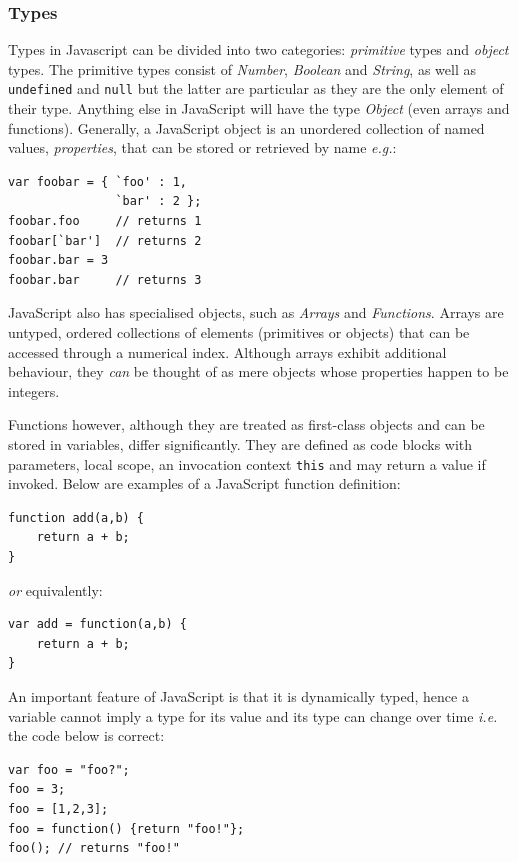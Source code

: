 \subsubsection{Types}
Types in Javascript can be divided into two categories: \emph{primitive} types and \emph{object} types. The primitive types consist of \emph{Number}, \emph{Boolean} and \emph{String}, as well as \texttt{undefined} and \texttt{null} but the latter are particular as they are the only element of their type. Anything else in JavaScript will have the type \emph{Object} (even arrays and functions). Generally, a JavaScript object is an unordered collection of named values, \emph{properties}, that can be stored or retrieved by name \emph{e.g.}:

\begin{lstlisting}
var foobar = { `foo' : 1,
               `bar' : 2 };
foobar.foo     // returns 1
foobar[`bar']  // returns 2
foobar.bar = 3
foobar.bar     // returns 3
\end{lstlisting}

JavaScript also has specialised objects, such as \emph{Arrays} and \emph{Functions}. Arrays are untyped, ordered collections of elements (primitives or objects) that can be accessed through a numerical index. Although arrays exhibit additional behaviour, they \emph{can} be thought of as mere objects whose properties happen to be integers.

Functions however, although they are treated as first-class objects and can be stored in variables, differ significantly. They are defined as code blocks with parameters, local scope, an invocation context \texttt{this} and may return a value if invoked. Below are examples of a JavaScript function definition:

\begin{lstlisting}
function add(a,b) {
    return a + b;
}
\end{lstlisting}
\noindent \emph{or} equivalently:

\begin{lstlisting}
var add = function(a,b) {
    return a + b;
}
\end{lstlisting}

An important feature of JavaScript is that it is dynamically typed, hence a variable cannot imply a type for its value and its type can change over time \emph{i.e.} the code below is correct:

\begin{lstlisting}
var foo = "foo?";
foo = 3;
foo = [1,2,3];
foo = function() {return "foo!"};
foo(); // returns "foo!"
\end{lstlisting}

